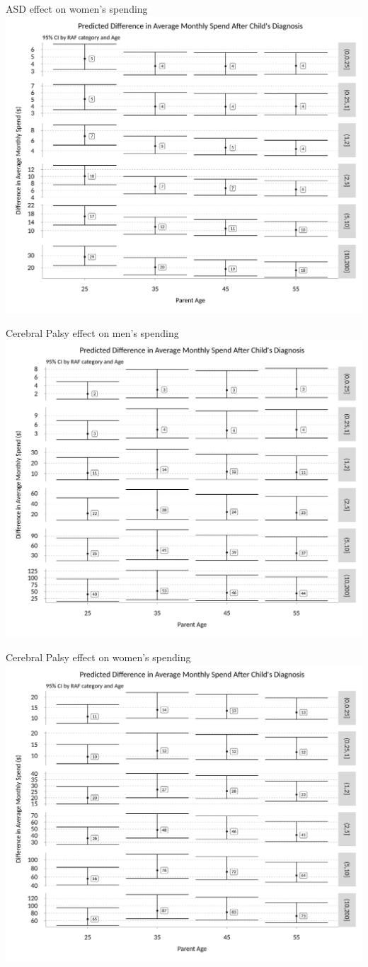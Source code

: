 \documentclass[xcolor=x11names,compress]{beamer}
\renewcommand{\(}{\begin{columns}}
\renewcommand{\)}{\end{columns}}
\newcommand{\<}[1]{\begin{column}{#1}}
\renewcommand{\>}{\end{column}}
\begin{document}
\begin{frame}{ASD effect on women's spending}
\includegraphics[width=.75\linewidth]{../figures/predicted_spend_female_ASD.png}
\end{frame}

\begin{frame}{Cerebral Palsy effect on men's spending}
\includegraphics[width=.75\linewidth]{../figures/predicted_spend_male_Cerebral.png}
\end{frame}

\begin{frame}{Cerebral Palsy effect on women's spending}
\includegraphics[width=.75\linewidth]{../figures/predicted_spend_female_Cerebral.png}
\end{frame}
\end{document}

